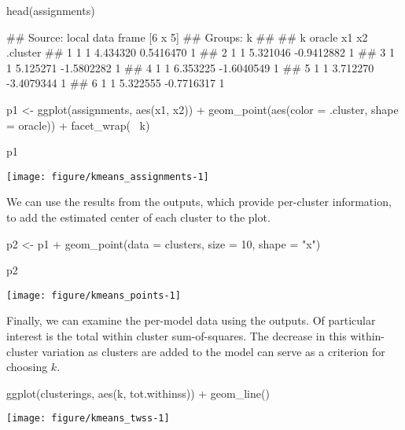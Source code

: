 \begin{center}

\begin{example}
head(assignments)
\end{example}

\begin{example}
## Source: local data frame [6 x 5]
## Groups: k
## 
##   k oracle       x1         x2 .cluster
## 1 1      1 4.434320  0.5416470        1
## 2 1      1 5.321046 -0.9412882        1
## 3 1      1 5.125271 -1.5802282        1
## 4 1      1 6.353225 -1.6040549        1
## 5 1      1 3.712270 -3.4079344        1
## 6 1      1 5.322555 -0.7716317        1

\end{example}

\begin{example}
p1 <- ggplot(assignments, aes(x1, x2)) +
    geom_point(aes(color = .cluster, shape = oracle)) +
    facet_wrap(~ k)
\end{example}

\begin{example}
p1
\end{example}

\texttt{[image: figure/kmeans\_assignments-1]} 
\end{center}

We can use the results from the  outputs, which provide per-cluster information, to add the estimated center of each cluster to the plot.

\begin{center}

\begin{example}
p2 <- p1 + geom_point(data = clusters, size = 10, shape = "x")
\end{example}

\begin{example}
p2
\end{example}

\texttt{[image: figure/kmeans\_points-1]} 
\end{center}

Finally, we can examine the per-model data using the  outputs. Of particular interest is the total within cluster sum-of-squares. The decrease in this within-cluster variation as clusters are added to the model can serve as a criterion for choosing $k$.

\begin{center}

\begin{example}
ggplot(clusterings, aes(k, tot.withinss)) + geom_line()
\end{example}

\texttt{[image: figure/kmeans\_twss-1]} 
\end{center}

